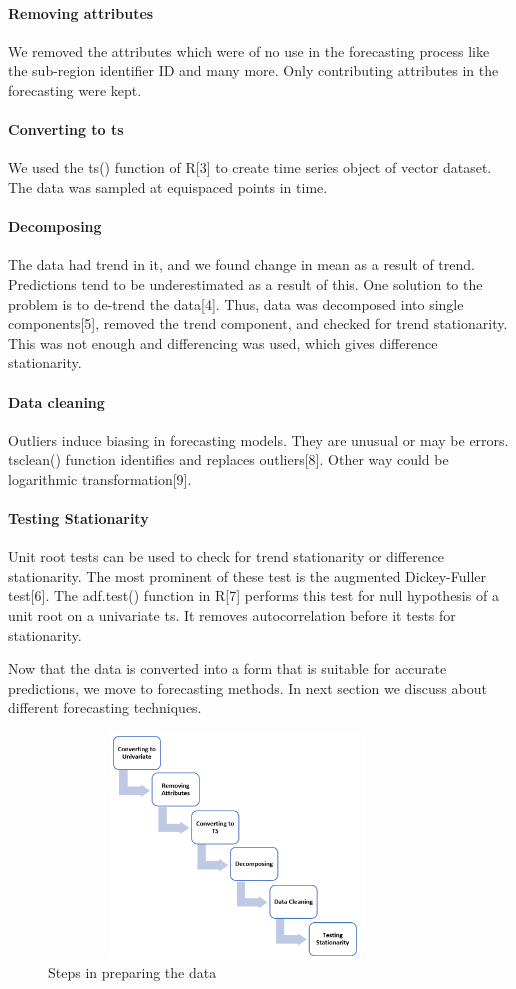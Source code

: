 \documentclass[runningheads]{llncs}
\begin{document}
\paragraph{Removing attributes} We removed the attributes which were of no use in the forecasting process like the sub-region identifier ID and many more. Only contributing attributes in the forecasting were kept.
\paragraph{Converting to ts} We used the ts() function of R[3] to create time series object of vector dataset. The data was sampled at equispaced points in time.
\paragraph{Decomposing} The data had trend in it, and we found change in mean as a result of trend. Predictions tend to be underestimated as a result of this. One solution to the problem is to de-trend the data[4]. Thus, data was decomposed into single components[5], removed the trend component, and checked for trend stationarity. This was not enough and differencing was used, which gives difference stationarity.
\paragraph{Data cleaning} Outliers induce biasing in forecasting models. They are unusual or may be errors.  tsclean() function identifies and replaces outliers[8]. Other way could be logarithmic transformation[9].
\paragraph{Testing Stationarity} Unit root tests can be used to check for trend stationarity or difference stationarity. The most prominent of these test is the augmented Dickey-Fuller test[6]. The adf.test() function in R[7] performs this test for null hypothesis of a unit root on a univariate ts. It removes autocorrelation before it tests for stationarity.

Now that the data is converted into a form that is suitable for accurate predictions, we move to forecasting methods. In next section we discuss about different forecasting techniques.
\begin{figure}
\centering
\includegraphics[scale=1,width=10cm,height=6cm]{chart.png}
\caption[20]{Steps in preparing the data}
\end{figure}
%
%
%
\end{document}
